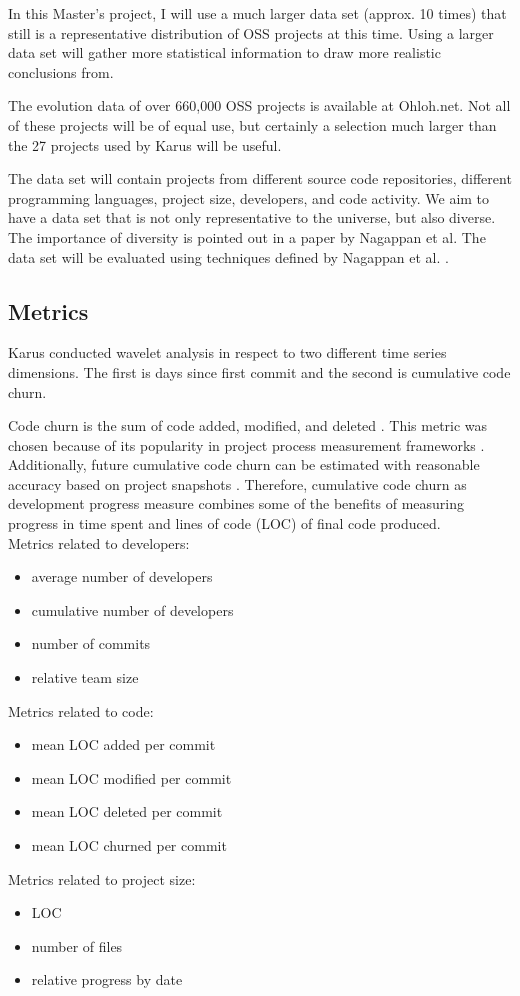 In this Master's project, I will use a much larger data set (approx. 10
times) that still is a representative distribution of OSS projects at this time.
Using a larger data set will gather more statistical information to draw more
realistic conclusions from.

The evolution data of over 660,000 OSS projects is available at Ohloh.net. Not
all of these projects will be of equal use, but certainly a selection much
larger than the 27 projects used by Karus will be useful.

The data set will contain projects from different source code repositories,
different programming languages, project size, developers, and code activity. We
aim to have a data set that is not only representative to the universe, but also
diverse. The importance of diversity is pointed out in a paper by Nagappan et
al. The data set will be evaluated using techniques defined by Nagappan et al.
\cite{nagappan}.

\subsection{Metrics}
Karus conducted wavelet analysis in respect to two different time series
dimensions. The first is days since first commit and the second is cumulative
code churn.

Code churn is the sum of code added, modified, and deleted \cite{elbaum}. This
metric was chosen because of its popularity in project process measurement
frameworks \cite{karus2013}. Additionally, future cumulative code churn can be
estimated with reasonable accuracy based on project snapshots \cite{dumas}.
Therefore, cumulative code churn as development progress measure combines some
of the benefits of measuring progress in time spent and lines of code (LOC) of
final code produced.
\\

\noindent
Metrics related to developers:
\begin{itemize}
	\item average number of developers
	\item cumulative number of developers
	\item number of commits
	\item relative team size
\end{itemize}
Metrics related to code:
\begin{itemize}
	\item mean LOC added per commit
	\item mean LOC modified per commit
	\item mean LOC deleted per commit
	\item mean LOC churned per commit
\end{itemize}
Metrics related to project size:
\begin{itemize}
	\item LOC
	\item number of files
	\item relative progress by date
\end{itemize}

